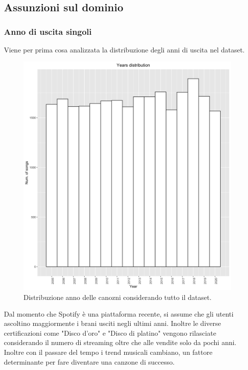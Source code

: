 \subsection{Assunzioni sul dominio}
\label{sec:assunzioni}
\subsubsection{Anno di uscita singoli}
Viene per prima cosa analizzata la distribuzione degli anni di uscita nel dataset.

\begin{figure}[H]
	\centering
	\includegraphics[width=13cm]{../images/years_distribution.png}
	\caption{Distribuzione anno delle canozni considerando tutto il dataset.}
	\label{fig:year_distribution_all}
\end{figure}

Dal momento che Spotify è una piattaforma recente, si assume che gli
utenti ascoltino maggiormente i brani usciti negli ultimi
anni. Inoltre le diverse certificazioni come "Disco d'oro" e "Disco di
platino" vengono rilasciate considerando il numero di streaming oltre
che alle vendite solo da pochi anni. Inoltre con il passare del tempo
i trend musicali cambiano, un fattore determinante per fare diventare
una canzone di successo.

